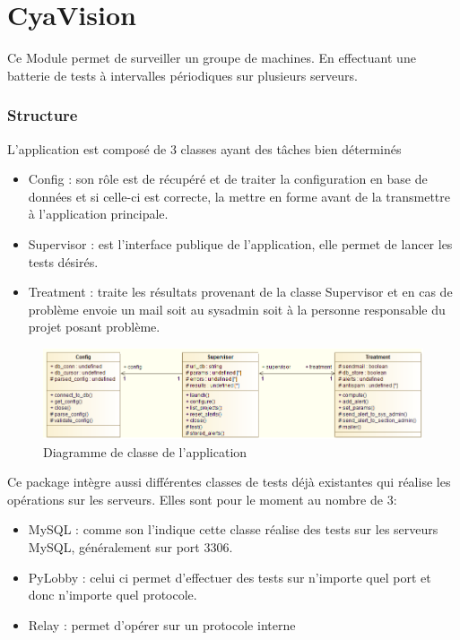 \part*{CyaVision}

Ce Module permet de surveiller un groupe de machines. En effectuant une batterie de tests à intervalles périodiques sur plusieurs serveurs.

\section*{Structure}

L'application est composé de 3 classes ayant des tâches bien déterminés

\begin{itemize}
	\item{Config} : son rôle est de récupéré et de traiter la configuration en base de données et si celle-ci est correcte, la mettre en forme avant de la transmettre à l'application principale. 
	\item{Supervisor} : est l'interface publique de l'application, elle permet de lancer les tests désirés.
	\item{Treatment} : traite les résultats provenant de la classe Supervisor et en cas de problème envoie un mail soit au sysadmin soit à la personne responsable du projet posant problème. 
\end{itemize}

\begin{figure}[h!]
	\centering
	\includegraphics[scale=0.5]{images/UML_supervision_v2.png}
	\caption{Diagramme de classe de l'application}
\end{figure}

Ce package intègre aussi différentes classes de tests déjà existantes qui réalise les opérations sur les serveurs.
Elles sont pour le moment au nombre de 3:

\begin{itemize}
	\item{MySQL} : comme son l'indique cette classe réalise des tests sur les serveurs MySQL, généralement sur port 3306.
	\item{PyLobby} : celui ci permet d'effectuer des tests sur n'importe quel port et donc n'importe quel protocole.
	\item{Relay} : permet d'opérer sur un protocole interne 
\end{itemize}

